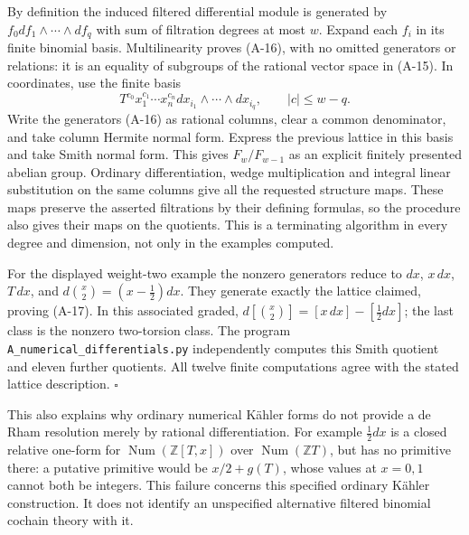 By definition the induced filtered differential module is generated
by $f_0df_1\wedge\cdots\wedge df_q$ with sum of filtration degrees
at most $w$. Expand each $f_i$ in its finite binomial basis.
Multilinearity proves (A-16), with no omitted generators or
relations: it is an equality of subgroups of the rational vector
space in (A-15). In coordinates, use the finite basis
\[
 T^{c_0}x_1^{c_1}\cdots x_n^{c_n}
 dx_{i_1}\wedge\cdots\wedge dx_{i_q},
 \qquad |c|\leq w-q.
\]
Write the generators (A-16) as rational columns, clear a common
denominator, and take column Hermite normal form. Express the
previous lattice in this basis and take Smith normal form. This
gives $F_w/F_{w-1}$ as an explicit finitely presented abelian group.
Ordinary differentiation, wedge multiplication and integral linear
substitution on the same columns give all the requested structure
maps. These maps preserve the asserted filtrations by their defining
formulas, so the procedure also gives their maps on the quotients.
This is a terminating algorithm in every degree and dimension, not
only in the examples computed.

For the displayed weight-two example the nonzero generators reduce
to $dx$, $x\,dx$, $T\,dx$, and
$d\binom x2=(x-\tfrac12)dx$. They generate exactly the lattice
claimed, proving (A-17). In this associated graded,
$d[\binom x2]=[x\,dx]-[\tfrac12dx]$; the last class is the
nonzero two-torsion class. The program
\texttt{A\_numerical\_differentials.py} independently computes this
Smith quotient and eleven further quotients. All twelve finite
computations agree with the stated lattice description.
\hfill$\square$

This also explains why ordinary numerical K\"ahler forms do not
provide a de Rham resolution merely by rational differentiation.
For example $\tfrac12dx$ is a closed relative one-form for
$\operatorname{Num}(\mathbb Z[T,x])$ over
$\operatorname{Num}(\mathbb Z T)$, but has no primitive there:
a putative primitive would be $x/2+g(T)$, whose values at $x=0,1$
cannot both be integers. This failure concerns this specified
ordinary K\"ahler construction. It does not identify an unspecified
alternative filtered binomial cochain theory with it.
